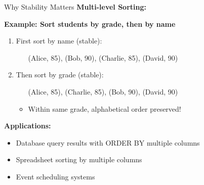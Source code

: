 \documentclass[aspectratio=169]{beamer}
\begin{document}
\begin{frame}{Why Stability Matters}
  \textbf{Multi-level Sorting:}

  \vspace{0.3cm}
  \textbf{Example: Sort students by grade, then by name}

  \begin{enumerate}
    \item First sort by name (stable):
    \begin{itemize}
      \item [(Alice, 85), (Bob, 90), (Charlie, 85), (David, 90)]
    \end{itemize}

    \vspace{0.2cm}
    \item Then sort by grade (stable):
    \begin{itemize}
      \item [(Alice, 85), (Charlie, 85), (Bob, 90), (David, 90)]
      \item {\color{blue} Within same grade, alphabetical order preserved!}
    \end{itemize}
  \end{enumerate}

  \vspace{0.3cm}
  \textbf{Applications:}
  \begin{itemize}
    \item Database query results with ORDER BY multiple columns
    \item Spreadsheet sorting by multiple columns
    \item Event scheduling systems
  \end{itemize}
\end{frame}
\end{document}
